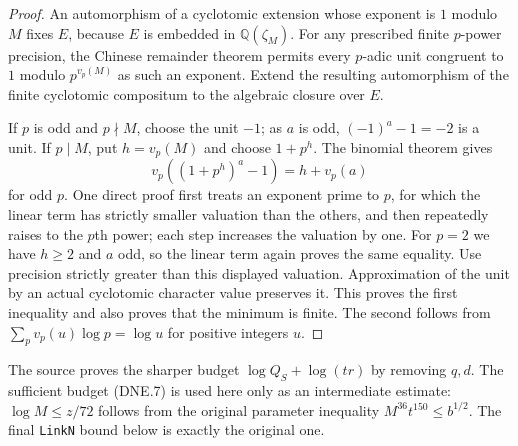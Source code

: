 \documentclass[11pt,a4paper]{article}
\numberwithin{equation}{section}
\theoremstyle{remark}\newtheorem{remark}[theorem]{Remark}
\begin{document}
\begin{proof}
An automorphism of a cyclotomic extension whose exponent is $1$
modulo $M$ fixes $E$, because $E$ is embedded in
$\mathbb Q(\zeta_M)$.  For any prescribed finite $p$-power precision,
the Chinese remainder theorem permits every $p$-adic unit congruent
to $1$ modulo $p^{v_p(M)}$ as such an exponent.  Extend the resulting
automorphism of the finite cyclotomic compositum to the algebraic
closure over $E$.

If $p$ is odd and $p\nmid M$, choose the unit $-1$; as $a$ is odd,
$(-1)^a-1=-2$ is a unit.  If $p\mid M$, put $h=v_p(M)$ and choose
$1+p^h$.  The binomial theorem gives
\[
 v_p((1+p^h)^a-1)=h+v_p(a)
\]
for odd $p$.  One direct proof first treats an exponent prime to
$p$, for which the linear term has strictly smaller valuation than
the others, and then repeatedly raises to the $p$th power; each
step increases the valuation by one.  For $p=2$ we have $h\ge2$
and $a$ odd, so the linear term again proves the same equality.
Use precision strictly greater than this displayed valuation.
Approximation of the unit by an actual cyclotomic character value
preserves it.  This proves the first inequality and also proves
that the minimum is finite.  The second follows from
$\sum_pv_p(u)\log p=\log u$ for positive integers $u$.
\end{proof}

The source proves the sharper budget $\log Q_S+\log(tr)$ by removing
$q,d$.  The sufficient budget (DNE.7) is used here only as an
intermediate estimate: $\log M\le z/72$ follows from the original
parameter inequality $M^{36}t^{150}\le b^{1/2}$.  The final
\texttt{Link\allowbreak N} bound below is exactly the original one.

\end{document}
